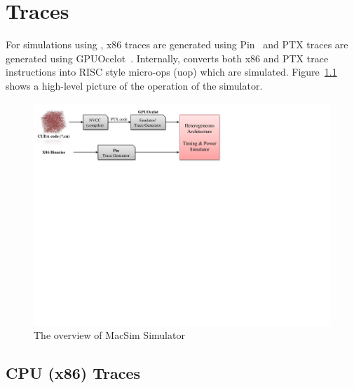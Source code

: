 \chapter{Traces}
\label{ch:trace}

For simulations using \SIM, x86 traces are generated using Pin~\cite{pin} and
PTX traces are generated using GPUOcelot~\cite{ocelot}. Internally, \SIM
converts both x86 and PTX trace instructions into RISC style micro-ops (uop)
  which are simulated.  Figure~\ref{fig:overview} shows a high-level picture of
  the operation of the simulator.

\begin{figure}[htb]
\centering \includegraphics{figs/macsim_overview}
\caption{The overview of MacSim Simulator}
\label{fig:overview}
\end{figure}





\section{CPU (x86) Traces}

